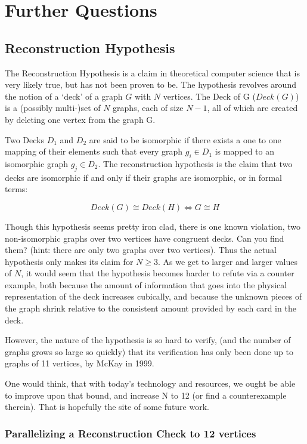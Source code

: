 \chapter{Further Questions}


\section{Reconstruction Hypothesis}

The Reconstruction Hypothesis is a claim in theoretical computer science that is very likely true, but has not been proven to be.
The hypothesis revolves around the notion of a `deck' of a graph $G$ with $N$ vertices.
The Deck of G ($Deck(G)$) is a (possibly multi-)set of $N$ graphs, each of size $N-1$, all of which are created by deleting one vertex from the graph G.

Two Decks $D_1$ and $D_2$ are said to be isomorphic if there exists a one to one mapping of their elements such that every graph $g_i \in D_1$ is mapped to an isomorphic graph $g_j \in D_2$.
The reconstruction hypothesis is the claim that two decks are isomorphic if and only if their graphs are isomorphic, or in formal terms:

$$ Deck(G) \cong Deck(H) \iff G \cong H$$

Though this hypothesis seems pretty iron clad, there is one known violation, two non-isomorphic graphs over two vertices have congruent decks. Can you find them? (hint: there are only two graphs over two vertices).
Thus the actual hypothesis only makes its claim for $N \geq 3$.
As we get to larger and larger values of $N$, it would seem that the hypothesis becomes harder to refute via a counter example, both because the amount of information that goes into the physical representation of the deck increases cubically, and because the unknown pieces of the graph shrink relative to the consistent amount provided by each card in the deck.

However, the nature of the hypothesis is so hard to verify, (and the number of graphs grows so large so quickly) that its verification has only been done up to graphs of 11 vertices, by McKay in 1999.

One would think, that with today's technology and resources, we ought be able to improve upon that bound, and increase N to 12 (or find a counterexample therein).
That is hopefully the site of some future work.

\subsection{Parallelizing a Reconstruction Check to 12 vertices}

